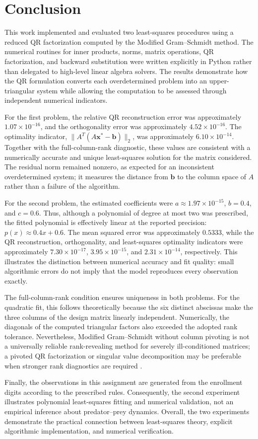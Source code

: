 \section{Conclusion}
\label{sec:conclusion}

This work implemented and evaluated two least-squares procedures using a
reduced QR factorization computed by the Modified Gram--Schmidt method.
The numerical routines for inner products, norms, matrix operations, QR
factorization, and backward substitution were written explicitly in Python
rather than delegated to high-level linear algebra solvers. The results
demonstrate how the QR formulation converts each overdetermined problem into
an upper-triangular system while allowing the computation to be assessed
through independent numerical indicators.

For the first problem, the relative QR reconstruction error was
approximately $1.07\times10^{-16}$, and the orthogonality error was
approximately $4.52\times10^{-16}$. The optimality indicator,
$\|A^T(A\mathbf{x}^*-\mathbf{b})\|_2$, was approximately
$6.10\times10^{-14}$. Together with the full-column-rank diagnostic, these
values are consistent with a numerically accurate and unique least-squares
solution for the matrix considered. The residual norm remained nonzero, as
expected for an inconsistent overdetermined system; it measures the distance
from $\mathbf b$ to the column space of $A$ rather than a failure of the
algorithm.

For the second problem, the estimated coefficients were
$a\approx1.97\times10^{-15}$, $b=0.4$, and $c=0.6$. Thus, although a
polynomial of degree at most two was prescribed, the fitted polynomial is
effectively linear at the reported precision: $p(x)\approx0.4x+0.6$. The
mean squared error was approximately $0.5333$, while the QR reconstruction,
orthogonality, and least-squares optimality indicators were approximately
$7.30\times10^{-17}$, $3.95\times10^{-15}$, and $2.31\times10^{-14}$,
respectively. This illustrates the distinction between numerical accuracy
and fit quality: small algorithmic errors do not imply that the model
reproduces every observation exactly.

The full-column-rank condition ensures uniqueness in both problems. For the
quadratic fit, this follows theoretically because the six distinct
abscissas make the three columns of the design matrix linearly independent.
Numerically, the diagonals of the computed triangular factors also exceeded
the adopted rank tolerance. Nevertheless, Modified Gram--Schmidt without
column pivoting is not a universally reliable rank-revealing method for
severely ill-conditioned matrices; a pivoted QR factorization or singular
value decomposition may be preferable when stronger rank diagnostics are
required \cite{higham2002accuracy}.

Finally, the observations in this assignment are generated from the
enrollment digits according to the prescribed rules. Consequently, the
second experiment illustrates polynomial least-squares fitting and
numerical validation, not an empirical inference about predator--prey
dynamics. Overall, the two experiments demonstrate the practical
connection between least-squares theory, explicit algorithmic
implementation, and numerical verification.
